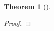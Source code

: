 \documentclass{amsart}
\title{}
\author{}
\date{}
\newtheorem{thm}{Theorem}[section]
\theoremstyle{definition}
\theoremstyle{remark}
\begin{document}
\maketitle

\section{}

\begin{thm}[] 
\end{thm}
	\begin{proof} 
	\end{proof}

  


\end{document}
